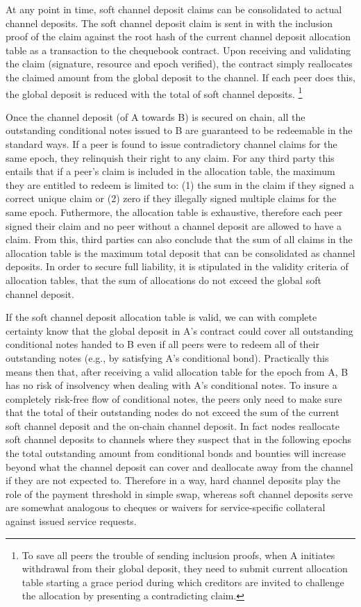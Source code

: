 \documentclass[a4paper,10pt]{article}
\begin{document}
At any point in time, soft channel deposit claims can be consolidated to actual
channel deposits.
The soft channel deposit claim is sent in with the inclusion proof of the claim against the root hash of the
current channel deposit allocation table as a transaction to the
chequebook contract. Upon receiving and validating the claim (signature, resource and epoch verified),
the contract simply reallocates the claimed amount from the global deposit to the channel.
If each peer does this, the global deposit is reduced with the total of soft channel
deposits.%
%
\footnote{To save all peers the trouble of sending inclusion proofs, when A initiates withdrawal from
their global deposit, they need to submit current allocation table starting a grace period during which
creditors are invited to challenge the allocation by presenting a contradicting claim.}

Once the channel deposit (of A towards B) is secured on chain, all the outstanding conditional notes
issued to B are guaranteed to be redeemable in the standard ways.
If a peer is found to issue contradictory channel claims for the same epoch, they relinquish
their right to any claim. For any third party this entails that if a peer's claim is
included in the allocation table, the maximum they are entitled to redeem is limited to:
(1) the sum in the claim if they signed a correct unique claim or
(2) zero if they illegally signed multiple claims for the same epoch.
Futhermore, the allocation table is exhaustive, therefore each
peer signed their claim and no peer without a channel deposit are allowed to have a claim. 
From this, third parties can also conclude that the sum of all claims in the
allocation table is the maximum total deposit that can be consolidated as channel deposits.
In order to secure full liability, it is stipulated in the validity criteria of allocation tables, that the sum of allocations do not exceed the global soft channel deposit.

If the soft channel deposit allocation table is valid,
we can with complete certainty know that the global deposit in A's contract
 could cover all outstanding conditional notes handed to B even if all peers were to redeem all of their outstanding notes (e.g., by satisfying A's conditional bond).
Practically this means then that, after receiving a valid allocation table for the epoch from A,
B has no risk of insolvency when dealing with A's conditional notes.
To insure a completely risk-free flow of conditional notes, the peers only  need to make sure that the total of their outstanding nodes do not exceed the sum of the current soft channel  deposit and the on-chain channel  deposit. 
In fact nodes reallocate soft channel deposits to channels where they suspect that in the following epochs the total outstanding amount from conditional bonds and bounties will increase beyond what the channel deposit can cover and deallocate away from the channel if they are not expected to.
Therefore in a way, hard channel deposits play the role of the payment  threshold in simple swap, whereas soft channel deposits serve are somewhat analogous to cheques or waivers for service-specific collateral against issued service requests. 
\end{document}
